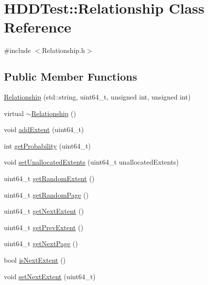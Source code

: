 \hypertarget{class_h_d_d_test_1_1_relationship}{\section{H\-D\-D\-Test\-:\-:Relationship Class Reference}
\label{class_h_d_d_test_1_1_relationship}
}


{\ttfamily \#include $<$Relationship.\-h$>$}

\subsection*{Public Member Functions}
\begin{DoxyCompactItemize}
\item 
\hyperlink{class_h_d_d_test_1_1_relationship_a60844c9f3d6bbc244e84fccaace8f8ce}{Relationship} (std\-::string, uint64\-\_\-t, unsigned int, unsigned int)
\item 
virtual \hyperlink{class_h_d_d_test_1_1_relationship_a57554a697ebd4128d471dc3a103020c6}{$\sim$\-Relationship} ()
\item 
void \hyperlink{class_h_d_d_test_1_1_relationship_afcafd9d406a021206887787f43453188}{add\-Extent} (uint64\-\_\-t)
\item 
int \hyperlink{class_h_d_d_test_1_1_relationship_a2f4a99590b8ce3522158ac30ab9adf2f}{get\-Probability} (uint64\-\_\-t)
\item 
void \hyperlink{class_h_d_d_test_1_1_relationship_a2ed606e57f4d5e3acbb3b0d905d1938e}{set\-Unallocated\-Extents} (uint64\-\_\-t unallocated\-Extents)
\item 
uint64\-\_\-t \hyperlink{class_h_d_d_test_1_1_relationship_af752170ba4eb288adf7e3cc04ce274a9}{get\-Random\-Extent} ()
\item 
uint64\-\_\-t \hyperlink{class_h_d_d_test_1_1_relationship_af1efe5fc2eda8fc97af447db84247c1f}{get\-Random\-Page} ()
\item 
uint64\-\_\-t \hyperlink{class_h_d_d_test_1_1_relationship_a8e9549c7ca201f7b3bf0efec375c52e2}{get\-Next\-Extent} ()
\item 
uint64\-\_\-t \hyperlink{class_h_d_d_test_1_1_relationship_a60827ca3c08026891845b4fec9ada22d}{get\-Prev\-Extent} ()
\item 
uint64\-\_\-t \hyperlink{class_h_d_d_test_1_1_relationship_a6366d75c0a634b72b8235f46d0a20793}{get\-Next\-Page} ()
\item 
bool \hyperlink{class_h_d_d_test_1_1_relationship_a53966cb62025f69c97a18919e83b98c0}{is\-Next\-Extent} ()
\item 
void \hyperlink{class_h_d_d_test_1_1_relationship_ae189760e0ed6b81f17b1c186b242daad}{set\-Next\-Extent} (uint64\-\_\-t)
\end{DoxyCompactItemize}
